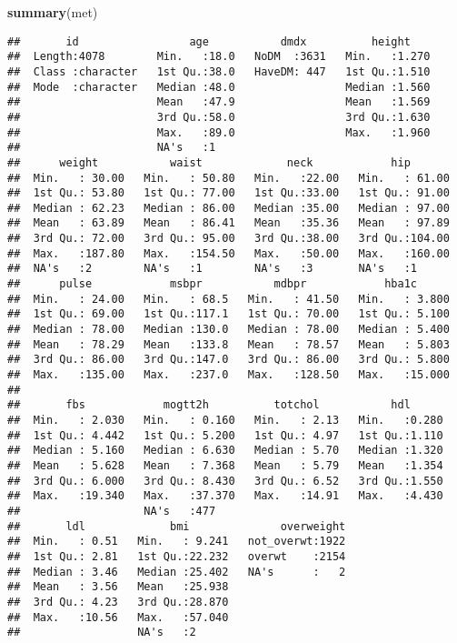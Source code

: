 \documentclass[
]{article}
\newenvironment{Shaded}{\begin{snugshade}}{\end{snugshade}}
\newcommand{\FunctionTok}[1]{\textcolor[rgb]{0.13,0.29,0.53}{\textbf{#1}}}
\newcommand{\NormalTok}[1]{#1}
\begin{document}
\begin{Shaded}
\begin{Highlighting}[]
\FunctionTok{summary}\NormalTok{(met)}
\end{Highlighting}
\end{Shaded}

\begin{verbatim}
##       id                 age           dmdx          height     
##  Length:4078        Min.   :18.0   NoDM  :3631   Min.   :1.270  
##  Class :character   1st Qu.:38.0   HaveDM: 447   1st Qu.:1.510  
##  Mode  :character   Median :48.0                 Median :1.560  
##                     Mean   :47.9                 Mean   :1.569  
##                     3rd Qu.:58.0                 3rd Qu.:1.630  
##                     Max.   :89.0                 Max.   :1.960  
##                     NA's   :1                                   
##      weight           waist             neck            hip        
##  Min.   : 30.00   Min.   : 50.80   Min.   :22.00   Min.   : 61.00  
##  1st Qu.: 53.80   1st Qu.: 77.00   1st Qu.:33.00   1st Qu.: 91.00  
##  Median : 62.23   Median : 86.00   Median :35.00   Median : 97.00  
##  Mean   : 63.89   Mean   : 86.41   Mean   :35.36   Mean   : 97.89  
##  3rd Qu.: 72.00   3rd Qu.: 95.00   3rd Qu.:38.00   3rd Qu.:104.00  
##  Max.   :187.80   Max.   :154.50   Max.   :50.00   Max.   :160.00  
##  NA's   :2        NA's   :1        NA's   :3       NA's   :1       
##      pulse            msbpr           mdbpr            hba1c       
##  Min.   : 24.00   Min.   : 68.5   Min.   : 41.50   Min.   : 3.800  
##  1st Qu.: 69.00   1st Qu.:117.1   1st Qu.: 70.00   1st Qu.: 5.100  
##  Median : 78.00   Median :130.0   Median : 78.00   Median : 5.400  
##  Mean   : 78.29   Mean   :133.8   Mean   : 78.57   Mean   : 5.803  
##  3rd Qu.: 86.00   3rd Qu.:147.0   3rd Qu.: 86.00   3rd Qu.: 5.800  
##  Max.   :135.00   Max.   :237.0   Max.   :128.50   Max.   :15.000  
##                                                                    
##       fbs            mogtt2h          totchol           hdl       
##  Min.   : 2.030   Min.   : 0.160   Min.   : 2.13   Min.   :0.280  
##  1st Qu.: 4.442   1st Qu.: 5.200   1st Qu.: 4.97   1st Qu.:1.110  
##  Median : 5.160   Median : 6.630   Median : 5.70   Median :1.320  
##  Mean   : 5.628   Mean   : 7.368   Mean   : 5.79   Mean   :1.354  
##  3rd Qu.: 6.000   3rd Qu.: 8.430   3rd Qu.: 6.52   3rd Qu.:1.550  
##  Max.   :19.340   Max.   :37.370   Max.   :14.91   Max.   :4.430  
##                   NA's   :477                                     
##       ldl             bmi              overweight  
##  Min.   : 0.51   Min.   : 9.241   not_overwt:1922  
##  1st Qu.: 2.81   1st Qu.:22.232   overwt    :2154  
##  Median : 3.46   Median :25.402   NA's      :   2  
##  Mean   : 3.56   Mean   :25.938                    
##  3rd Qu.: 4.23   3rd Qu.:28.870                    
##  Max.   :10.56   Max.   :57.040                    
##                  NA's   :2
\end{verbatim}
\end{document}
